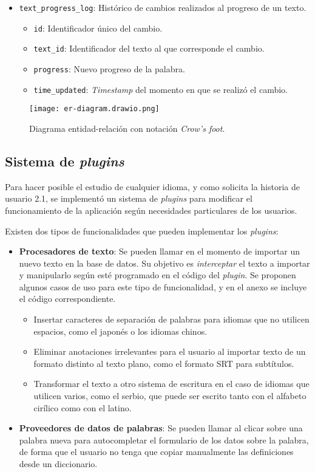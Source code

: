 \begin{itemize}
	\item \texttt{text\_progress\_log}: Histórico de cambios realizados al progreso de un texto.
	\begin{itemize}[label=$\star$]
		\item \texttt{id}: Identificador único del cambio.
		\item \texttt{text\_id}: Identificador del texto al que corresponde el cambio.
		\item \texttt{progress}: Nuevo progreso de la palabra.
		\item \texttt{time\_updated}: \textit{Timestamp} del momento en que se realizó el cambio.
	\end{itemize}
\end{itemize}

\begin{figure}
	\texttt{[image: er-diagram.drawio.png]}
	\caption[Diagrama entidad-relación]{Diagrama entidad-relación con notación \textit{Crow's foot}.}
\end{figure}

\subsection{Sistema de \textit{plugins}}

Para hacer posible el estudio de cualquier idioma, y como solicita la historia de usuario 2.1, se implementó un sistema de \textit{plugins} para modificar el funcionamiento de la aplicación según necesidades particulares de los usuarios.

Existen dos tipos de funcionalidades que pueden implementar los \textit{plugins}:
\begin{itemize}
	\item \textbf{Procesadores de texto}: Se pueden llamar en el momento de importar un nuevo texto en la base de datos. Su objetivo es \textit{interceptar} el texto a importar y manipularlo según esté programado en el código del \textit{plugin}. Se proponen algunos casos de uso para este tipo de funcionalidad, y en el anexo se incluye el código correspondiente.
	\begin{itemize}[label=$\star$]
		\item Insertar caracteres de separación de palabras para idiomas que no utilicen espacios, como el japonés o los idiomas chinos.
		\item Eliminar anotaciones irrelevantes para el usuario al importar texto de un formato distinto al texto plano, como el formato SRT para subtítulos.
		\item Transformar el texto a otro sistema de escritura en el caso de idiomas que utilicen varios, como el serbio, que puede ser escrito tanto con el alfabeto cirílico como con el latino.
	\end{itemize}
	\item \textbf{Proveedores de datos de palabras}: Se pueden llamar al clicar sobre una palabra nueva para autocompletar el formulario de los datos sobre la palabra, de forma que el usuario no tenga que copiar manualmente las definiciones desde un diccionario.
\end{itemize}


